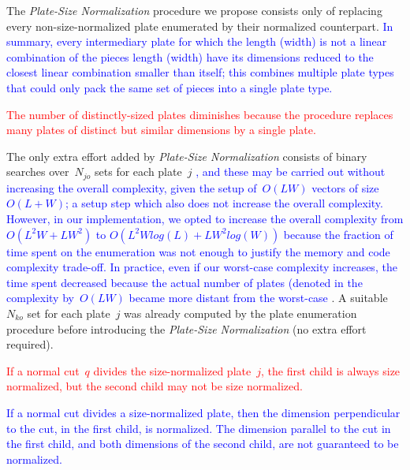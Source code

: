 \documentclass[ppgc,tese,english,formais,babel]{iiufrgs}
\newif\iffinalversion
\newcommand{\newtext}[1]{\iffinalversion%
#1%
\else%
\textcolor{blue}{#1}%
\fi%
}
\newcommand{\oldtext}[1]{\iffinalversion%
\else%
\textcolor{red}{#1}%
\fi%
}
\begin{document}
The \emph{Plate-Size Normalization} procedure we propose consists only of replacing every non-size-normalized plate enumerated by their normalized counterpart.
\newtext{In summary, every intermediary plate for which the length (width) is not a linear combination of the pieces length (width) have its dimensions reduced to the closest linear combination smaller than itself; this combines multiple plate types that could only pack the same set of pieces into a single plate type.}
\oldtext{The number of distinctly-sized plates diminishes because the procedure replaces many plates of distinct but similar dimensions by a single plate.}
The only extra effort added by \emph{Plate-Size Normalization} consists of binary searches over~\(N_{jo}\) sets for each plate~\(j\)\newtext{, and these may be carried out without increasing the overall complexity, given the setup of~\(O(LW)\) vectors of size \(O(L + W)\); a setup step which also does not increase the overall complexity. However, in our implementation, we opted to increase the overall complexity from \(O(L^2W + LW^2)\) to \(O(L^2Wlog(L) + LW^2log(W))\) because the fraction of time spent on the enumeration was not enough to justify the memory and code complexity trade-off. In practice, even if our worst-case complexity increases, the time spent decreased because the actual number of plates (denoted in the complexity by~\(O(LW)\) became more distant from the worst-case}.
A suitable \(N_{ko}\) set for each plate~\(j\) was already computed by the plate enumeration procedure before introducing the \emph{Plate-Size Normalization} (no extra effort required).

\begin{remark}
\oldtext{If a normal cut~\(q\) divides the size-normalized plate~\(j\), the first child is always size normalized, but the second child may not be size normalized.}
\newtext{If a normal cut divides a size-normalized plate, then the dimension perpendicular to the cut, in the first child, is normalized. The dimension parallel to the cut in the first child, and both dimensions of the second child, are not guaranteed to be normalized.}
\end{remark}


% 
% 

\end{document}
